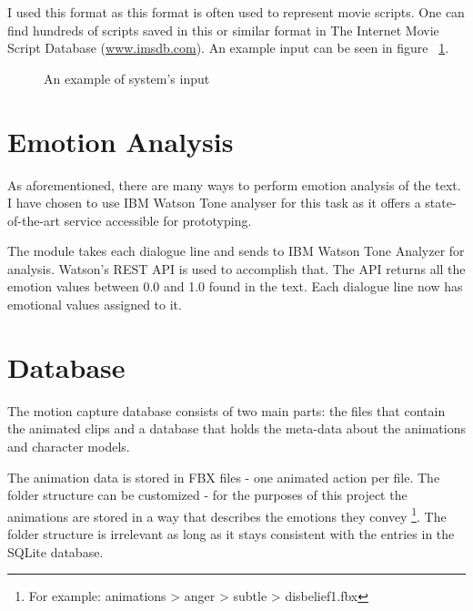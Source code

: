 I used this format as this format is often used to represent movie scripts. One can find hundreds of scripts saved in this or similar format in The Internet Movie Script Database (\url{www.imsdb.com}). An example input can be seen in figure ~\ref{fig:inputscript}.


\begin{figure}[H]
\centerline{}
\caption{An example of system's input}\label{fig:inputscript}
\end{figure}


\section{Emotion Analysis} 
\label{sec:emoanal}
As aforementioned, there are many ways to perform emotion analysis of the text. I have chosen to use IBM Watson Tone analyser for this task as it offers a state-of-the-art service accessible for prototyping.

The module takes each dialogue line and sends to IBM Watson Tone Analyzer for analysis. Watson's REST API is used to accomplish that. The API returns all the emotion values between 0.0 and 1.0 found in the text. Each dialogue line now has emotional values assigned to it.

\section{Database}
\label{sec:dbdesign}

The motion capture database consists of two main parts: the files that contain the animated clips and a database that holds the meta-data about the animations and character models.

The animation data is stored in FBX files - one animated action per file. The folder structure can be customized - for the purposes of this project the animations are stored in a way that describes the emotions they convey \footnote{For example: animations > anger > subtle > disbelief1.fbx}. The folder structure is irrelevant as long as it stays consistent with the entries in the SQLite database. 

